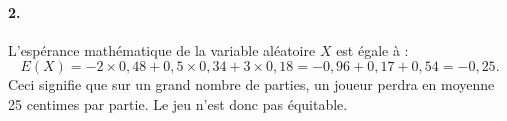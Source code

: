 \documentclass[10pt]{article}
\begin{document}
\paragraph{2.}
L'espérance mathématique de la variable aléatoire \(X\) est égale à :
\[
E(X) = -2 \times 0{,}48 + 0{,}5 \times 0{,}34 + 3 \times 0{,}18 = -0{,}96 + 0{,}17 + 0{,}54 = -0{,}25.
\]
Ceci signifie que sur un grand nombre de parties, un joueur perdra en moyenne 25 centimes par partie. Le jeu n'est donc pas équitable.
\end{document}
